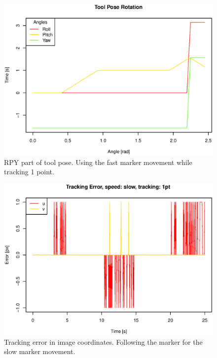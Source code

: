\begin{figure}[H]
\centering
\includegraphics[width= \linewidth]{graphics/robotics/toolPose_fast_1pt}
\caption{RPY part of tool pose. Using the fast marker movement while tracking 1 point.}
\label{fig:toolpose_fast_1p_rpy}
\end{figure}


\begin{figure}[H]
\centering
\includegraphics[width= \linewidth]{graphics/robotics/trackingError_slow_1pt}
\caption{Tracking error in image coordinates.
Following the marker for the slow marker movement.}
\label{fig:trackingerror_slow_1p}
\end{figure}

